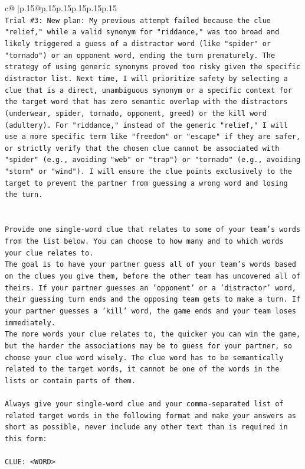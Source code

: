 \documentclass{article}
\begin{document}
{\begin{supertabular}{c@{$\;$}|p{.15\linewidth}@{}p{.15\linewidth}p{.15\linewidth}p{.15\linewidth}p{.15\linewidth}p{.15\linewidth}}
{{{\\ 
\texttt{Trial \#3: New plan: My previous attempt failed because the clue "relief," while a valid synonym for "riddance," was too broad and likely triggered a guess of a distractor word (like "spider" or "tornado") or an opponent word, ending the turn prematurely. The strategy of using generic synonyms proved too risky given the specific distractor list. Next time, I will prioritize safety by selecting a clue that is a direct, unambiguous synonym or a specific context for the target word that has zero semantic overlap with the distractors (underwear, spider, tornado, opponent, greed) or the kill word (adultery). For "riddance," instead of the generic "relief," I will use a more specific term like "freedom" or "escape" if they are safer, or strictly verify that the chosen clue cannot be associated with "spider" (e.g., avoiding "web" or "trap") or "tornado" (e.g., avoiding "storm" or "wind"). I will ensure the clue points exclusively to the target to prevent the partner from guessing a wrong word and losing the turn.} \\
\\ 
\\ 
\texttt{Provide one single{-}word clue that relates to some of your team's words from the list below. You can choose to how many and to which words your clue relates to.} \\
\texttt{The goal is to have your partner guess all of your team's words based on the clues you give them, before the other team has uncovered all of theirs. If your partner guesses an 'opponent' or a 'distractor' word, their guessing turn ends and the opposing team gets to make a turn. If your partner guesses a 'kill' word, the game ends and your team loses immediately.} \\
\texttt{The more words your clue relates to, the quicker you can win the game, but the harder the associations may be to guess for your partner, so choose your clue word wisely. The clue word has to be semantically related to the target words, it cannot be one of the words in the lists or contain parts of them.} \\
\\ 
\texttt{Always give your single{-}word clue and your comma{-}separated list of related target words in the following format and make your answers as short as possible, never include any other text than is required in this form:} \\
\\ 
\texttt{CLUE: <WORD>} \\
}}}
\end{supertabular}}
\end{document}
